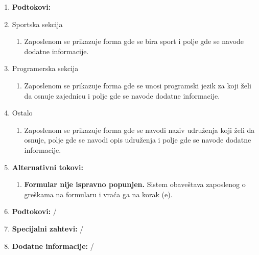 \documentclass[a4paper]{article}
\begin{document}
\begin{enumerate}
    \item \textbf{Podtokovi:}
        \item Sportska sekcija
            \begin{enumerate}
                \item Zaposlenom se prikazuje forma gde se bira sport i polje gde se navode dodatne informacije.
            \end{enumerate}
        \item Programerska sekcija
            \begin{enumerate}
                \item Zaposlenom se prikazuje forma gde se unosi programski jezik za koji želi da osnuje zajednicu i polje gde se navode dodatne informacije.
            \end{enumerate}
        \item Ostalo
            \begin{enumerate}
                \item Zaposlenom se prikazuje forma gde se navodi naziv udruženja koji želi da osnuje, polje gde se navodi opis udruženja i polje gde se navode dodatne informacije.
            \end{enumerate}
    \item \textbf{Alternativni tokovi:}
        \begin{enumerate}
            \item \textbf{Formular nije ispravno popunjen.} Sistem obaveštava zaposlenog o greškama na formularu i vraća ga na korak (e).
        \end{enumerate}
    \item \textbf{Podtokovi:} /
    \item \textbf{Specijalni zahtevi:} /
    \item \textbf{Dodatne informacije:} /
\end{enumerate}
\end{document}
